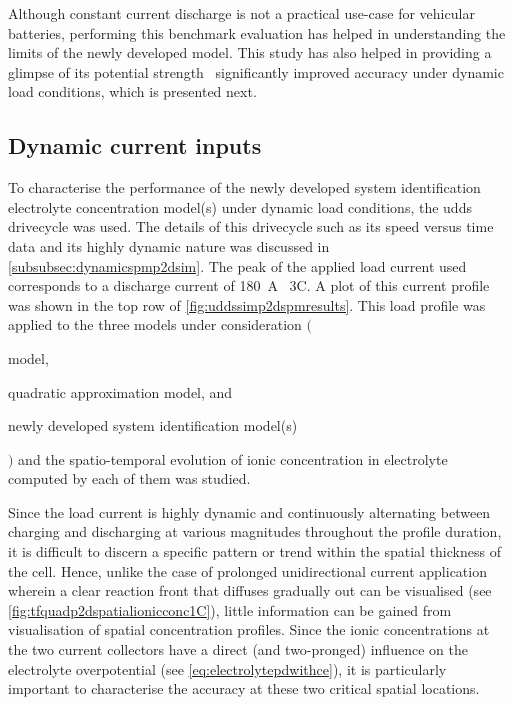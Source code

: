 Although constant  current discharge is  not a practical use-case  for vehicular
batteries, performing this benchmark evaluation  has helped in understanding the
limits of the newly  developed model. This study has also  helped in providing a
glimpse of its  potential strength \viz~significantly  improved accuracy under
dynamic load conditions, which is presented next.

\subsection{Dynamic current inputs}

To characterise  the performance  of the  newly developed  system identification
electrolyte   concentration  model(s)   under  dynamic   load  conditions,   the
\gls{udds}  drivecycle  was  used.  The  details  of  this  drivecycle  such  as
its  speed  versus  time  data  and its  highly  dynamic  nature  was  discussed
in \cref{subsubsec:dynamicspmp2dsim}. The peak of  the applied load current used
corresponds to a discharge current of \SI{180}{\ampere} \ie~3C. A plot of this
current  profile was  shown in  the top  row of \cref{fig:uddssimp2dspmresults}.
This  load  profile  was  applied   to  the  three  models  under  consideration
$\big($\begin{enumerate*}[label=\itshape\alph*\upshape)] \item {}
model,  \item   quadratic  approximation   model,  and  \item   newly  developed
system identification  model(s) \end{enumerate*}$\big)$
and the spatio-temporal evolution of ionic concentration in electrolyte computed
by each of them was studied.

Since  the  load   current  is  highly  dynamic   and  continuously  alternating
between  charging   and  discharging   at  various  magnitudes   throughout  the
profile   duration,   it   is   difficult  to   discern   a   specific   pattern
or   trend  within   the  spatial   thickness   of  the   cell.  Hence,   unlike
the   case   of  prolonged   unidirectional   current   application  wherein   a
clear   reaction  front   that  diffuses   gradually  out   can  be   visualised
(see \cref{fig:tfquadp2dspatialionicconc1C}), little  information can  be gained
from  visualisation   of  spatial   concentration  profiles.  Since   the  ionic
concentrations at  the two  current collectors have  a direct  (and two-pronged)
influence on the  electrolyte overpotential (see \cref{eq:electrolytepdwithce}),
it is particularly important to characterise  the accuracy at these two critical
spatial locations.

